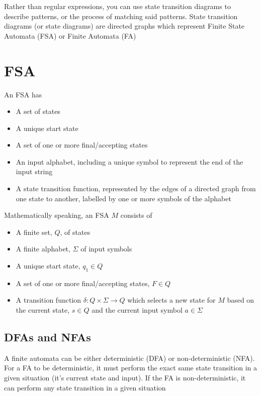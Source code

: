
Rather than regular expressions, you can use state transition diagrams to describe patterns, or the process of matching
 said patterns. State transition diagrams (or state diagrams) are directed graphs which represent Finite State Automata
 (FSA) or Finite Automata (FA)

\section*{FSA}

An FSA has
\begin{itemize}
  \item A set of states
  \item A unique start state
  \item A set of one or more final/accepting states
  \item An input alphabet, including a unique symbol to represent the end of the input string
  \item A state transition function, represented by the edges of a directed graph from one state to another, labelled by
   one or more symbols of the alphabet
\end{itemize}

Mathematically speaking, an FSA $M$ consists of
\begin{itemize}
  \item A finite set, $Q$, of states
  \item A finite alphabet, $\Sigma$ of input symbols
  \item A unique start state, $q_1 \in Q$
  \item A set of one or more final/accepting states, $F \in Q$
  \item A transition function $\delta : Q \times \Sigma \rightarrow Q$ which selects a new state for $M$ based on the
   current state, $s \in Q$ and the current input symbol $a \in \Sigma$
\end{itemize}

\subsection*{DFAs and NFAs}

A finite automata can be either deterministic (DFA) or non-deterministic (NFA). For a FA to be deterministic, it must
 perform the exact same state transition in a given situation (it's current state and input). If the FA is
 non-deterministic, it can perform any state transition in a given situation

